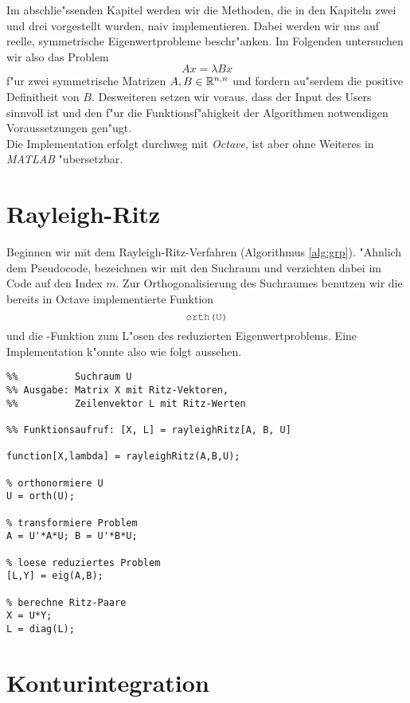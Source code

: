 Im abschlie"ssenden Kapitel werden wir die Methoden, die in den Kapiteln zwei und drei vorgestellt wurden, naiv implementieren.
Dabei werden wir uns auf reelle, symmetrische Eigenwertprobleme beschr"anken. Im Folgenden untersuchen wir also das Problem
\[
Ax = \lambda Bx
\]
f"ur zwei symmetrische Matrizen $A,B\in\mathbb{R}^{n,n}$ und
fordern au"serdem die positive Definitheit von $B$.
Desweiteren setzen wir voraus, dass der Input des Users sinnvoll ist und den f"ur die Funktionsf"ahigkeit der Algorithmen notwendigen Voraussetzungen gen"ugt.\\

Die Implementation erfolgt durchweg mit \emph{Octave}, ist aber ohne Weiteres in \emph{MATLAB}
"ubersetzbar.

\section{Rayleigh-Ritz}
Beginnen wir mit dem Rayleigh-Ritz-Verfahren (Algorithmus \ref{alg:grp}). "Ahnlich dem Pseudocode, bezeichnen wir mit 
den Suchraum und verzichten dabei im Code auf den Index $m$. Zur Orthogonalisierung des Suchraumes benutzen wir die bereits in Octave implementierte Funktion
\[
\mcode{orth(U)}
\]
und die -Funktion zum L"osen des reduzierten Eigenwertproblems. Eine Implementation k"onnte also wie folgt aussehen.

\begin{lstlisting}[caption=Implementation des Rayleigh-Ritz Verfahrens zur Bestimmung eines Ritz-Paares., captionpos=b]
%% Eingabe: Matrizen A, B des Eigenwertproblems,
%%          Suchraum U
%% Ausgabe: Matrix X mit Ritz-Vektoren,
%%          Zeilenvektor L mit Ritz-Werten

%% Funktionsaufruf: [X, L] = rayleighRitz[A, B, U]

function[X,lambda] = rayleighRitz(A,B,U);

% orthonormiere U
U = orth(U);

% transformiere Problem
A = U'*A*U; B = U'*B*U;

% loese reduziertes Problem
[L,Y] = eig(A,B);

% berechne Ritz-Paare
X = U*Y;
L = diag(L);

\end{lstlisting}







\section{Konturintegration}

